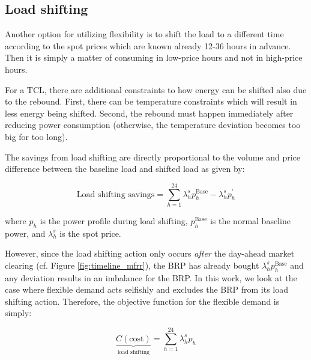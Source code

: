 \subsection{Load shifting}

Another option for utilizing flexibility is to shift the load to a different time according to the spot prices which are known already 12-36 hours in advance. Then it is simply a matter of consuming in low-price hours and not in high-price hours.

For a TCL, there are additional constraints to how energy can be shifted also due to the rebound. First, there can be temperature constraints which will result in less energy being shifted. Second, the rebound must happen immediately after reducing power consumption (otherwise, the temperature deviation becomes too big for too long).

The savings from load shifting are directly proportional to the volume and price difference between the baseline load and shifted load as given by:

\begin{equation}\label{eq:load_shifting_savings}
    \text{Load shifting savings} = \sum_{h=1}^{24} \lambda^{s}_{h} p^{\text{Base}}_{h} - \lambda^{s}_{h} p^{\prime}_{h}
\end{equation}

where $p_{h}$ is the power profile during load shifting, $p^{\text{Base}}_{h}$ is the normal baseline power, and $\lambda^{s}_{h}$ is the spot price.

However, since the load shifting action only occurs \textit{after} the day-ahead market clearing (cf. Figure \ref{fig:timeline_mfrr}), the BRP has already bought $\lambda^{s}_{h} p^{\text{Base}}_{h}$ and any deviation results in an imbalance for the BRP. In this work, we look at the case where flexible demand acts selfishly and excludes the BRP from its load shifting action. Therefore, the objective function for the flexible demand is simply:

\begin{equation}\label{eq:LoadShiftingObjective}
    \underbrace{C(\text{cost})}_{\text{load shifting}} = \sum_{h=1}^{24} \lambda_{h}^{s} p_{h}
\end{equation}
